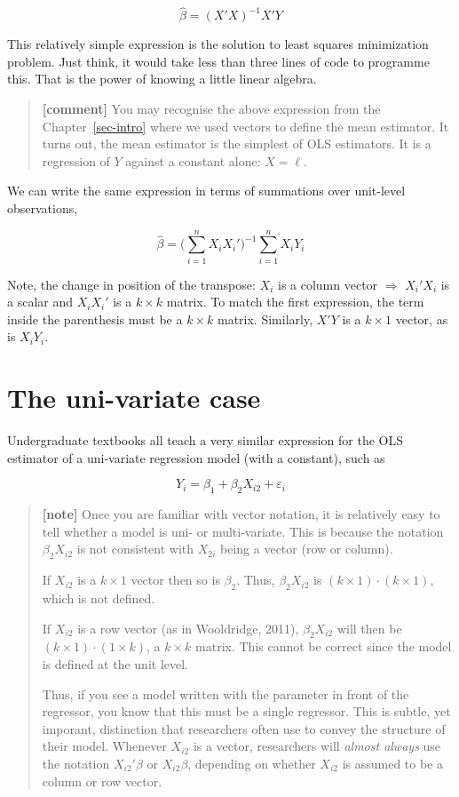 \documentclass[
  letterpaper,
  DIV=11,
  numbers=noendperiod]{scrreprt}
\begin{document}
\[ \hat{\beta} = (X'X)^{-1}X'Y \]

This relatively simple expression is the solution to least squares
minimization problem. Just think, it would take less than three lines of
code to programme this. That is the power of knowing a little linear
algebra.

\begin{quote}
\textbf{{[}comment{]}} You may recognise the above expression from the
Chapter~\ref{sec-intro} where we used vectors to define the mean
estimator. It turns out, the mean estimator is the simplest of OLS
estimators. It is a regression of \(Y\) against a constant alone:
\(X=\ell\).
\end{quote}

We can write the same expression in terms of summations over unit-level
observations,

\[ \hat{\beta} = \big(\sum_{i=1}^nX_iX_i')^{-1}\sum_{i=1}^nX_iY_i \]

Note, the change in position of the transpose: \(X_i\) is a column
vector \(\Rightarrow\) \(X_i'X_i\) is a scalar and \(X_iX_i'\) is a
\(k\times k\) matrix. To match the first expression, the term inside the
parenthesis must be a \(k\times k\) matrix. Similarly, \(X'Y\) is a
\(k\times 1\) vector, as is \(X_iY_i\).

\hypertarget{the-uni-variate-case}{%
\section{The uni-variate case}\label{the-uni-variate-case}}

Undergraduate textbooks all teach a very similar expression for the OLS
estimator of a uni-variate regression model (with a constant), such as

\[
Y_i = \beta_1+\beta_2X_{i2}+\varepsilon_i
\]

\begin{quote}
\textbf{{[}note{]}} Once you are familiar with vector notation, it is
relatively easy to tell whether a model is uni- or multi-variate. This
is because the notation \(\beta_2 X_{i2}\) is not consistent with
\(X_{2i}\) being a vector (row or column).

If \(X_{i2}\) is a \(k\times 1\) vector then so is \(\beta_2\). Thus,
\(\beta_2 X_{i2}\) is \((k\times 1)\cdot (k\times1)\), which is not
defined.

If \(X_{i2}\) is a row vector (as in Wooldridge, 2011),
\(\beta_2 X_{i2}\) will then be \((k\times 1)\cdot (1\times k)\), a
\(k\times k\) matrix. This cannot be correct since the model is defined
at the unit level.

Thus, if you see a model written with the parameter in front of the
regressor, you know that this must be a single regressor. This is
subtle, yet imporant, distinction that researchers often use to convey
the structure of their model. Whenever \(X_{i2}\) is a vector,
researchers will \emph{almost always} use the notation \(X_{i2}'\beta\)
or \(X_{i2}\beta\), depending on whether \(X_{i2}\) is assumed to be a
column or row vector.
\end{quote}
\end{document}
